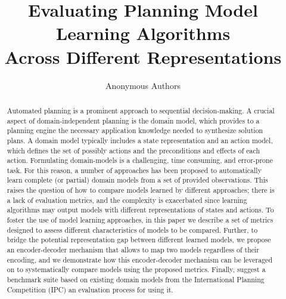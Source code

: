 \documentclass{article}
\title{Evaluating Planning Model Learning Algorithms \\ Across Different Representations}
\author{Anonymous Authors}
\theoremstyle{definition}
\theoremstyle{remark}
\begin{document}
\maketitle

\begin{abstract}
Automated planning is a prominent approach to sequential decision-making. A crucial aspect of domain-independent planning is the domain model, which provides to a planning engine the necessary application knowledge needed to synthesize solution plans. A domain model typically includes a state representation and an action model, which defines the set of possibly actions and the preconditions and effects of each action. 
Formulating domain-models is a challenging, time consuming, and error-prone task. For this reason, a number of approaches has been proposed to automatically learn complete (or partial) domain models from a set of provided observations. This raises the question of how to compare models learned by different approaches; there is a lack of evaluation metrics, and the complexity is exacerbated since learning algorithms may output models with different representations of states and actions. 
To foster the use of model learning approaches, in this paper we describe a set of metrics designed to assess different characteristics of models to be compared. Further, to bridge the potential representation gap between different learned models, we propose an encoder-decoder mechanism that allows to map two models regardless of their encoding, and we demonstrate how this encoder-decoder mechanism can be leveraged on to systematically compare models using the proposed metrics. Finally, suggest a benchmark suite based on existing domain models from the International Planning Competition (IPC) an evaluation process for using it. 



\end{abstract}
\end{document}
